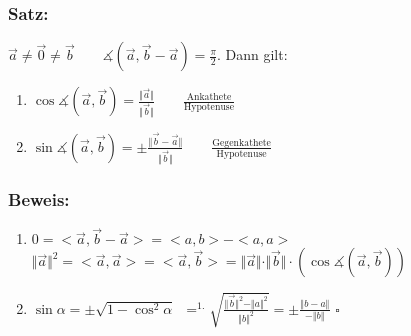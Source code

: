 \subsubsection{Satz:}	
$\vec{a} \neq \vec{0} \neq \vec{b} \qquad \measuredangle(\vec{a},\vec{b}-\vec{a})=\frac{\pi}{2}$. Dann gilt:
%
%
\begin{enumerate}
	\item $\cos \measuredangle(\vec{a},\vec{b})=\frac{\Vert\vec{a}\Vert}
	{\Vert\vec{b}\Vert} \qquad \frac{\textrm{Ankathete}}{\textrm{Hypotenuse}}$
	\item $\sin\measuredangle(\vec{a},\vec{b})=\pm\frac{\Vert\vec{b}-\vec{a}\Vert}
	{\Vert\vec{b}\Vert} \qquad \frac{\textrm{Gegenkathete}}{\textrm{Hypotenuse}}$
\end{enumerate}
%
%
%
\subsubsection{Beweis:}
\begin{enumerate}
	\item $0=<\vec{a},\vec{b}-\vec{a}>=<a,b>-<a,a>$\\
	$\Vert\vec{a}\Vert^{2}=<\vec{a},\vec{a}>=<\vec{a},\vec{b}>=
	\Vert\vec{a}\Vert\cdot\Vert\vec{b}\Vert\cdot(\cos\measuredangle(\vec{a},
	\vec{b}))$
	\item $\sin\alpha=\pm\sqrt{1-\cos^{2}\alpha}$\
		$\mathop{=}^{\text{1.}}\sqrt{\frac{\Vert\vec{b}\Vert^{2}-\Vert a \Vert^{2}}
		{\Vert b \Vert^{2}}} =\pm \frac{\Vert b-a\Vert}{-\Vert b \Vert}$ \qquad 	
		$\square$
\end{enumerate}
